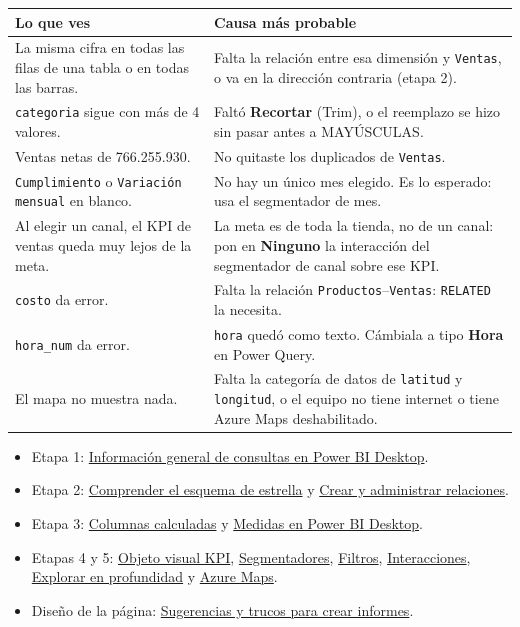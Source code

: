 \documentclass[11pt]{article}
\newcommand{\urlconsultas}{https://learn.microsoft.com/es-es/power-bi/transform-model/desktop-query-overview}
\newcommand{\urlrelaciones}{https://learn.microsoft.com/es-es/power-bi/transform-model/desktop-create-and-manage-relationships}
\newcommand{\urlestrella}{https://learn.microsoft.com/es-es/power-bi/guidance/star-schema}
\newcommand{\urlcolumnas}{https://learn.microsoft.com/es-es/power-bi/transform-model/desktop-calculated-columns}
\newcommand{\urlmedidas}{https://learn.microsoft.com/es-es/power-bi/transform-model/desktop-measures}
\newcommand{\urlkpi}{https://learn.microsoft.com/es-es/power-bi/visuals/power-bi-visualization-kpi}
\newcommand{\urlsegmentadores}{https://learn.microsoft.com/es-es/power-bi/visuals/power-bi-visualization-slicers}
\newcommand{\urlfiltros}{https://learn.microsoft.com/es-es/power-bi/create-reports/power-bi-report-add-filter}
\newcommand{\urlinteracciones}{https://learn.microsoft.com/es-es/power-bi/create-reports/service-reports-visual-interactions}
\newcommand{\urlexplorar}{https://learn.microsoft.com/es-es/power-bi/explore-reports/end-user-drill}
\newcommand{\urlazuremaps}{https://learn.microsoft.com/es-es/azure/azure-maps/power-bi-visual-get-started}
\newcommand{\urltrucos}{https://learn.microsoft.com/es-es/power-bi/create-reports/desktop-tips-and-tricks-for-creating-reports}
\newcommand{\menu}[2]{\textbf{#1} {\color{black!55}(#2)}}
\newcommand{\subtitulo}[1]{\par\needspace{3\baselineskip}\vspace{4pt}{\large\bfseries\color{esumerNavyDark} #1}\par}
\begin{document}
\small
\renewcommand{\arraystretch}{1.2}
\begin{tabularx}{\textwidth}{@{}>{\raggedright\arraybackslash}p{5.6cm} >{\raggedright\arraybackslash}X@{}}
\toprule
\textbf{Lo que ves} & \textbf{Causa más probable}\\
\midrule
La misma cifra en todas las filas de una tabla o en todas las barras. & Falta la relación entre esa dimensión y \texttt{Ventas}, o va en la dirección contraria (etapa 2).\\
\texttt{categoria} sigue con más de 4 valores. & Faltó \menu{Recortar}{Trim}, o el reemplazo se hizo sin pasar antes a MAYÚSCULAS.\\
Ventas netas de 766.255.930. & No quitaste los duplicados de \texttt{Ventas}.\\
\texttt{Cumplimiento} o \texttt{Variación mensual} en blanco. & No hay un único mes elegido. Es lo esperado: usa el segmentador de mes.\\
Al elegir un canal, el KPI de ventas queda muy lejos de la meta. & La meta es de toda la tienda, no de un canal: pon en \textbf{Ninguno} la interacción del segmentador de canal sobre ese KPI.\\
\texttt{costo} da error. & Falta la relación \texttt{Productos}--\texttt{Ventas}: \texttt{RELATED} la necesita.\\
\texttt{hora\_num} da error. & \texttt{hora} quedó como texto. Cámbiala a tipo \textbf{Hora} en Power Query.\\
El mapa no muestra nada. & Falta la categoría de datos de \texttt{latitud} y \texttt{longitud}, o el equipo no tiene internet o tiene Azure Maps deshabilitado.\\
\bottomrule
\end{tabularx}
\renewcommand{\arraystretch}{1.0}
\normalsize

\subtitulo{Documentación oficial}

\small
\begin{itemize}[itemsep=1pt, topsep=2pt]
  \item Etapa 1: \href{\urlconsultas}{\color{esumerOrange}Información general de consultas en Power BI Desktop}.
  \item Etapa 2: \href{\urlestrella}{\color{esumerOrange}Comprender el esquema de estrella} y
    \href{\urlrelaciones}{\color{esumerOrange}Crear y administrar relaciones}.
  \item Etapa 3: \href{\urlcolumnas}{\color{esumerOrange}Columnas calculadas} y
    \href{\urlmedidas}{\color{esumerOrange}Medidas en Power BI Desktop}.
  \item Etapas 4 y 5: \href{\urlkpi}{\color{esumerOrange}Objeto visual KPI},
    \href{\urlsegmentadores}{\color{esumerOrange}Segmentadores},
    \href{\urlfiltros}{\color{esumerOrange}Filtros},
    \href{\urlinteracciones}{\color{esumerOrange}Interacciones},
    \href{\urlexplorar}{\color{esumerOrange}Explorar en profundidad} y
    \href{\urlazuremaps}{\color{esumerOrange}Azure Maps}.
  \item Diseño de la página: \href{\urltrucos}{\color{esumerOrange}Sugerencias y trucos para crear informes}.
\end{itemize}
\normalsize
\end{document}
